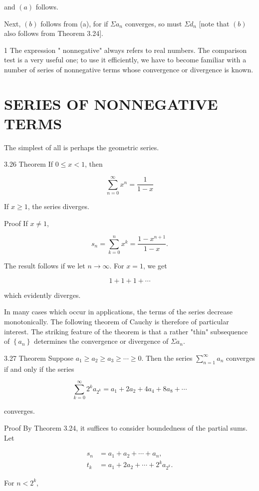 \documentclass[10pt]{article}
\begin{document}
and $(a)$ follows.

Next, $(b)$ follows from (a), for if $\Sigma a_{n}$ converges, so must $\Sigma d_{n}$ [note that $(b)$ also follows from Theorem 3.24].

1 The expression " nonnegative" always refers to real numbers. The comparison test is a very useful one; to use it efficiently, we have to become familiar with a number of series of nonnegative terms whose convergence or divergence is known.

\section{SERIES OF NONNEGATIVE TERMS}
The simplest of all is perhaps the geometric series.

3.26 Theorem If $0 \leq x<1$, then

$$
\sum_{n=0}^{\infty} x^{n}=\frac{1}{1-x}
$$

If $x \geq 1$, the series diverges.

Proof If $x \neq 1$,

$$
s_{n}=\sum_{k=0}^{n} x^{k}=\frac{1-x^{n+1}}{1-x} .
$$

The result follows if we let $n \rightarrow \infty$. For $x=1$, we get

$$
1+1+1+\cdots
$$

which evidently diverges.

In many cases which occur in applications, the terms of the series decrease monotonically. The following theorem of Cauchy is therefore of particular interest. The striking feature of the theorem is that a rather "thin" subsequence of $\left\{a_{n}\right\}$ determines the convergence or divergence of $\Sigma a_{n}$.

3.27 Theorem Suppose $a_{1} \geq a_{2} \geq a_{3} \geq \cdots \geq 0$. Then the series $\sum_{n=1}^{\infty} a_{n}$ converges if and only if the series

$$
\sum_{k=0}^{\infty} 2^{k} a_{2^{k}}=a_{1}+2 a_{2}+4 a_{4}+8 a_{8}+\cdots
$$

converges.

Proof By Theorem 3.24, it suffices to consider boundedness of the partial sums. Let

$$
\begin{aligned}
s_{n} & =a_{1}+a_{2}+\cdots+a_{n}, \\
t_{k} & =a_{1}+2 a_{2}+\cdots+2^{k} a_{2^{k}} .
\end{aligned}
$$

For $n<2^{k}$,
\end{document}
